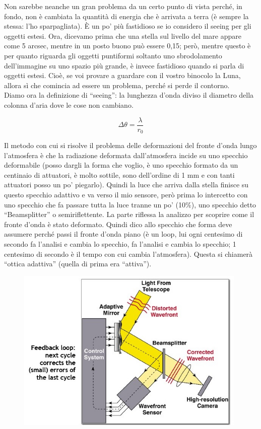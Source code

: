 \documentclass[a4paper,11pt]{article}
\begin{document}
Non sarebbe neanche un gran problema da un certo punto di vista perché, in fondo, non è cambiata la quantità di energia che è arrivata a terra (è sempre la stessa: l’ho sparpagliata). È un po’ più fastidioso se io considero il seeing per gli oggetti estesi. Ora, dicevamo prima che una stella sul livello del mare appare come 5 arcsec, mentre in un posto buono può essere 0,15; però, mentre questo è  per quanto riguarda gli oggetti puntiformi soltanto uno sbrodolamento dell’immagine su uno spazio più grande, è invece fastidioso quando si parla di oggetti estesi. Cioè, se voi provare a guardare con il vostro binocolo la Luna, allora sì che comincia ad essere un problema, perché si perde il contorno.\\ 
 Diamo ora la definizione di “seeing”: la lunghezza d’onda diviso il diametro della colonna d’aria dove le cose non cambiano.

  $$ \Delta\theta=\frac{\lambda}{r_0} $$

Il metodo con cui si risolve il problema delle deformazioni del fronte d’onda lungo l’atmosfera è che la radiazione deformata dall’atmosfera incide su uno specchio deformabile (posso dargli la forma che voglio, è uno specchio formato da un centinaio di attuatori, è molto sottile, sono dell’ordine di 1 mm e con tanti attuatori posso un po’ piegarlo). Quindi la luce che arriva dalla stella finisce su questo specchio adattivo e va verso il mio sensore, però prima lo intercetto con uno specchio che fa passare tutta la luce tranne un po’ (10\%), uno specchio detto “Beamsplitter” o semiriflettente. La parte riflessa la analizzo per scoprire come il fronte d’onda è stato deformato. Quindi dico allo specchio che forma deve assumere perché passi il fronte d’onda piano (è un loop, lui ogni centesimo di secondo fa l’analisi e cambia lo specchio, fa l’analisi e cambia lo specchio; 1 centesimo di secondo è il tempo con cui cambia l’atmosfera). Questa si chiamerà “ottica adattiva” (quella di prima era “attiva”).

\begin{figure}[h!!]
        \centering
        \includegraphics[width=11cm]{21.jpg}
        \label{}
    \end{figure}
\end{document}
